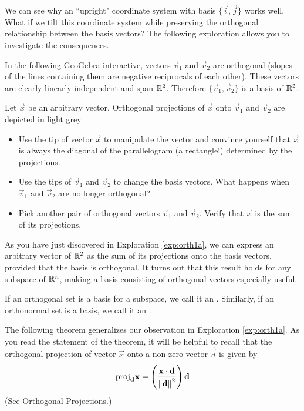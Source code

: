 \documentclass{ximera}
\begin{document}
We can see why an ``upright" coordinate system with basis $\{\vec{i},\vec{j}\}$ works well.  What if we tilt this coordinate system while preserving the orthogonal relationship between the basis vectors?  The following exploration allows you to investigate the consequences.

\begin{exploration}\label{exp:orth1a}
    In the following GeoGebra interactive, vectors $\vec{v}_1$ and $\vec{v}_2$ are orthogonal (slopes of the lines containing them are negative reciprocals of each other).  These vectors are clearly linearly independent and span $\mathbb{R}^2$.  Therefore $\{\vec{v}_1,\vec{v}_2\}$ is a basis of $\mathbb{R}^2$.  
    
    Let $\vec{x}$ be an arbitrary vector.  Orthogonal projections of $\vec{x}$ onto $\vec{v}_1$ and $\vec{v}_2$ are depicted in light grey.
    \begin{itemize}
           \item Use the tip of vector $\vec{x}$ to manipulate the vector and convince yourself that $\vec{x}$ is always the diagonal of the parallelogram (a rectangle!) determined by the projections.
        \item Use the tips of $\vec{v}_1$ and $\vec{v}_2$ to change the basis vectors.  What happens when $\vec{v}_1$ and $\vec{v}_2$ are no longer orthogonal?
        \item Pick another pair of orthogonal vectors $\vec{v}_1$ and $\vec{v}_2$.  Verify that $\vec{x}$ is the sum of its projections.
    \end{itemize}

    \begin{center}
\end{center}
\end{exploration}


As you have just discovered in Exploration \ref{exp:orth1a}, we can express an arbitrary vector of $\mathbb{R}^2$ as the sum of its projections onto the basis vectors, provided that the basis is orthogonal. It turns out that this result holds for any subspace of $\mathbb{R}^n$, making a basis consisting of orthogonal vectors especially useful. 

If an orthogonal set is a basis for a subspace, we call it an
. Similarly, if an orthonormal set is a basis, we call it an .


The following theorem generalizes our observation in Exploration \ref{exp:orth1a}.  As you read the statement of the theorem, it will be helpful to recall that the orthogonal projection of vector $\vec{x}$ onto a non-zero vector $\vec{d}$ is given by
\begin{equation}\label{eq:orthProj}
\mbox{proj}_{\mathbf{d}}\mathbf{x}=\left(\frac{\mathbf{x}\cdot\mathbf{d}}{\left\lVert\mathbf{d}\right\rVert^2}\right)\mathbf{d}
\end{equation}
(See \href{https://ximera.osu.edu/oerlinalg/LinearAlgebra/VEC-0070/main}{Orthogonal Projections}.)
\end{document}
